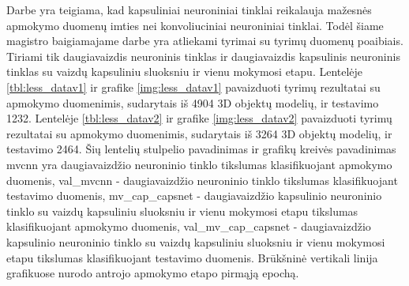 
Darbe \cite{capsNet} yra teigiama, kad kapsuliniai neuroniniai tinklai reikalauja mažesnės apmokymo duomenų imties nei konvoliuciniai neuroniniai tinklai. Todėl šiame magistro baigiamajame darbe yra atliekami tyrimai su tyrimų duomenų poaibiais. Tiriami tik daugiavaizdis neuroninis tinklas ir daugiavaizdis kapsulinis neuroninis tinklas su vaizdų kapsuliniu sluoksniu ir vienu mokymosi etapu. Lentelėje \ref{tbl:less_datav1} ir grafike \ref{img:less_datav1} pavaizduoti tyrimų rezultatai su apmokymo duomenimis, sudarytais iš 4904 3D objektų modelių, ir testavimo 1232. Lentelėje \ref{tbl:less_datav2} ir grafike \ref{img:less_datav2} pavaizduoti tyrimų rezultatai su apmokymo duomenimis, sudarytais iš 3264 3D objektų modelių, ir testavimo 2464. Šių lentelių stulpelio pavadinimas ir grafikų kreivės pavadinimas mvcnn yra daugiavaizdžio neuroninio tinklo tikslumas klasifikuojant apmokymo duomenis, val\_mvcnn - daugiavaizdžio neuroninio tinklo tikslumas klasifikuojant testavimo duomenis, mv\_cap\_capsnet - daugiavaizdžio kapsulinio neuroninio tinklo su vaizdų kapsuliniu sluoksniu ir vienu mokymosi etapu tikslumas klasifikuojant apmokymo duomenis, val\_mv\_cap\_capsnet - daugiavaizdžio kapsulinio neuroninio tinklo su vaizdų kapsuliniu sluoksniu ir vienu mokymosi etapu tikslumas klasifikuojant testavimo duomenis. Brūkšninė vertikali linija grafikuose nurodo antrojo apmokymo etapo pirmąją epochą.

